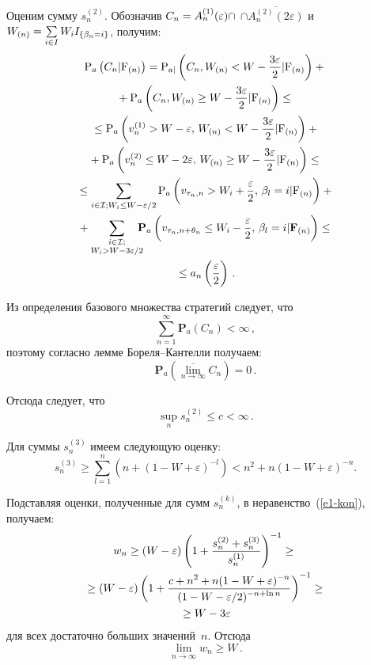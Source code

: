 \begin{multicols}{2}
  Оценим сумму $s_n^{(2)}$. Обозначив 
$C_n\hm=A_n^{(1)}(\varepsilon)\cap$\linebreak 
$\cap\overline{A_n^{(2)}(2\varepsilon)}$ и $W_{(n)}\hm=\sum\limits_{i\in 
I} W_i I_{\{\beta_n=i\}}$, получим:
  \begin{multline*}
  \mathrm{P}_{a}\left(C_n\vert \mathrm{ F}_{(n)}\right)=
  \mathrm{P}_{a|} \left( C_n, W_{(n)}<W-\displaystyle\frac{\displaystyle 3\varepsilon\mathstrut}{\displaystyle 2\mathstrut}\vert \mathrm{
  F}_{(n)}\right) +{}\\
  {}+ \mathrm{P}_{a}\left( 
  C_n, W_{(n)}\geq W-\displaystyle\frac{\displaystyle 3\varepsilon\mathstrut}{\displaystyle 2\mathstrut}\vert \mathrm{
  F}_{(n)}\right)\leq{}\\
  {}\leq \mathrm{P}_{a}\left( v_n^{(1)}>W-\varepsilon,\, W_{(n)}<W-\displaystyle\frac{\displaystyle 3\varepsilon\mathstrut}{\displaystyle 2\mathstrut}\vert \mathrm{
  F}_{(n)}\right)+{}\\
  {}+
  \mathrm{P}_{a} \left( v_n^{(2)}\leq W-2\varepsilon,\, W_{(n)}\geq W-
\displaystyle\frac{\displaystyle 3\varepsilon\mathstrut}{\displaystyle 2\mathstrut}\vert \mathrm{
  F}_{(n)}\right)\leq{}\\
  {}\leq \sum\limits_{i\in \mathcal{I}; W_i\leq W- \varepsilon/2} \mathrm{P}_{a}\left(
  v_{\tau_n,n}>W_i+\displaystyle\frac{\displaystyle \varepsilon\mathstrut}{\displaystyle 2\mathstrut},\, \beta_l=i\vert\mathrm{F}_{(n)}\right)+{}\\
  {}+\sum\limits_{\substack{{i\in \mathcal{I};}\\ {W_i> W- 3\varepsilon/2}}}\!\!\!\!
   \mathbf{P}_{a} \left( 
v_{\tau_n,n+\theta_n}\leq W_i-\displaystyle\frac{\displaystyle \varepsilon\mathstrut}{\displaystyle 2\mathstrut},\,\beta_l=i\vert\mathbf{F}_{(n)}\right)\leq {}\\
{}\leq
a_n\left( \displaystyle\frac{\displaystyle \varepsilon\mathstrut}{\displaystyle 2\mathstrut}\right)\,.
  \end{multline*}
  
  Из определения базового множества стратегий следует, что
  $$
  \sum\limits_{n=1}^\infty \mathbf{P}_{a} (C_n)<\infty\,,
  $$
поэтому согласно лемме Бо\-ре\-ля--Кан\-тел\-ли полу\-чаем:
\begin{equation}
\mathbf{P}_{a}\left( \overline{\lim\limits_{n\rightarrow\infty}} C_n\right) =0\,.
\label{e3-kon}
\end{equation}
  
  Отсюда следует, что
  $$
  \sup\limits_n s_n^{(2)}\leq c<\infty\,.
  $$
  
  Для суммы $s_n^{(3)}$ имеем следующую оценку:
  $$
  s_n^{(3)}\geq \sum\limits_{l=1}^n \left(n+(1-W+\varepsilon)^{-l}\right)< n^2+n(1-
W+\varepsilon)^{-n}.
  $$
  
  Подставляя оценки, полученные для сумм $s_n^{(k)}$, в неравенство~(\ref{e1-kon}), 
получаем:
  \begin{multline*}
  w_n\geq (W-\varepsilon) \left( 1+\displaystyle\frac{\displaystyle s_n^{(2)}+s_n^{(3)}\mathstrut}{\displaystyle s_n^{(1)}\mathstrut}\right)^{-1}\geq 
{}\\
  {}\geq (W-\varepsilon)\left( 1+\displaystyle\frac{\displaystyle c+n^2+n(1-W+\varepsilon)^{-n}\mathstrut}{\displaystyle (1-W-\varepsilon/2)^{-
n+\ln n}\mathstrut}\right)^{-1}\geq{}\\
{}\geq W-3\varepsilon
  \end{multline*}
для всех достаточно больших значений~$n$. Отсюда
\begin{equation}
\lim\limits_{\overline{n\rightarrow\infty}} w_n\geq W\,.
\label{e4-kon}
\end{equation}
  

\end{multicols}
